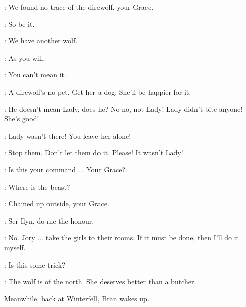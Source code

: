\SOLDIERa: We found no trace of the direwolf, your Grace. 

\ROBERT: So be it. 

\CERSEI: We have another wolf. 

\ROBERT: As you will. 

\NED: You can't mean it. 

\ROBERT: A direwolf's no pet. Get her a dog. She'll be happier for it.

\SANSA: He doesn't mean Lady, does he? No no, not Lady! Lady didn't bite anyone! She's good! 

\ARYA: Lady wasn't there! You leave her alone! 

\SANSA: Stop them. Don't let them do it. Please! It wasn't Lady! 

\NED: Is this your command $\ldots$ Your Grace? 

\CERSEI: Where is the beast? 

\SOLDIERa: Chained up outside, your Grace. 

\CERSEI: Ser Ilyn, do me the honour. 

\NED: No. Jory $\ldots$ take the girls to their rooms. If it must be done, then I'll do it myself. 

\CERSEI: Is this some trick? 

\NED: The wolf is of the north. She deserves better than a butcher.


\scene

\n Meanwhile, back at Winterfell, Bran wakes up.


